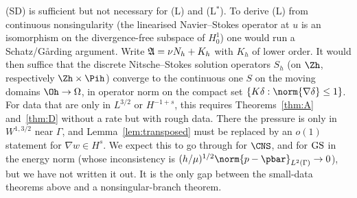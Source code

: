\begin{remark}\label{ns:branch}
(SD) is sufficient but not necessary for (L) and (L$^\ast$). To derive (L) from continuous nonsingularity (the linearised Navier--Stokes operator at $u$ is an isomorphism on the divergence-free subspace of $H^1_0$) one would run a Schatz/G\aa rding argument. Write $\mathfrak A=\nu N_h+K_h$ with $K_h$ of lower order. It would then suffice that the discrete Nitsche--Stokes solution operators $S_h$ (on $\Zh$, respectively $\Zh\times\Pih$) converge to the continuous one $S$ on the moving domains $\Oh\to\Omega$, in operator norm on the compact set $\{K\delta:\norm{\nabla\delta}\le1\}$. For data that are only in $L^{3/2}$ or $H^{-1+s}$, this requires Theorems~\ref{thm:A} and~\ref{thm:D} without a rate but with rough data. There the pressure is only in $W^{1,3/2}$ near $\Gamma$, and Lemma~\ref{lem:transposed} must be replaced by an $o(1)$ statement for $\nabla w\in H^{s}$. We expect this to go through for $\CNS$, and for $\mathrm{GS}$ in the energy norm (whose inconsistency is $(h/\mu)^{1/2}\norm{p-\pbar}_{L^2(\Gamma)}\to0$), but we have not written it out. It is the only gap between the small-data theorems above and a nonsingular-branch theorem.
\end{remark}

